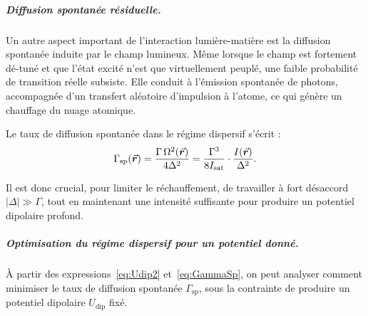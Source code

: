 %

\subparagraph{Diffusion spontanée résiduelle.}

Un autre aspect important de l’interaction lumière-matière est la diffusion spontanée induite par le champ lumineux. Même lorsque le champ est fortement dé-tuné et que l’état excité n’est que virtuellement peuplé, une faible probabilité de transition réelle subsiste. Elle conduit à l’émission spontanée de photons, accompagnée d’un transfert aléatoire d’impulsion à l’atome, ce qui génère un chauffage du nuage atomique.

Le taux de diffusion spontanée dans le régime dispersif s’écrit :
\begin{eqnarray}
\Gamma_{\mathrm{sp}}(\vec{{\bm{r}}}) = \frac{\Gamma \, \Omega^2(\vec{{\bm{r}}})}{4 \Delta^2}
= \frac{\Gamma^3}{8 I_{\mathrm{sat}}} \cdot \frac{I(\vec{{\bm{r}}})}{\Delta^2}.
\label{eq:GammaSp}
\end{eqnarray}

Il est donc crucial, pour limiter le réchauffement, de travailler à fort désaccord \( |\Delta| \gg \Gamma \), tout en maintenant une intensité suffisante pour produire un potentiel dipolaire profond.


%

\subparagraph{Optimisation du régime dispersif pour un potentiel donné.}

À partir des expressions~\eqref{eq:Udip2} et~\eqref{eq:GammaSp}, on peut analyser comment minimiser le taux de diffusion spontanée \( \Gamma_{\mathrm{sp}} \), sous la contrainte de produire un potentiel dipolaire \( U_{\mathrm{dip}} \) fixé.

